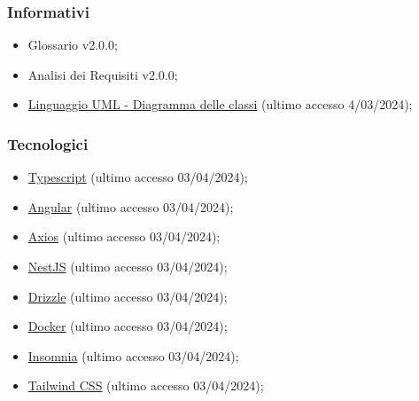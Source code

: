 \subsubsection{Informativi}
\begin{itemize}
	\item Glossario v2.0.0;
	\item Analisi dei Requisiti v2.0.0;
	\item \href{https://www.math.unipd.it/~rcardin/swea/2023/Diagrammi\%20delle\%20Classi.pdf}
	      {Linguaggio UML - Diagramma delle classi} (ultimo accesso 4/03/2024);
\end{itemize}

\subsubsection{Tecnologici}
\begin{itemize}
	\item \href{https://www.typescriptlang.org/}
	      {Typescript} (ultimo accesso 03/04/2024);

	\item \href{https://angular.io/}
	      {Angular} (ultimo accesso 03/04/2024);

	\item \href{https://axios-http.com/}
	      {Axios} (ultimo accesso 03/04/2024);

	\item \href{https://nestjs.com/}
	      {NestJS} (ultimo accesso 03/04/2024);

	\item \href{https://orm.drizzle.team/}
	      {Drizzle} (ultimo accesso 03/04/2024);

	\item \href{https://www.docker.com/}
	      {Docker} (ultimo accesso 03/04/2024);

	\item \href{https://insomnia.rest/}
	      {Insomnia} (ultimo accesso 03/04/2024);

	\item \href{https://tailwindcss.com/}
	      {Tailwind CSS} (ultimo accesso 03/04/2024);
\end{itemize}

